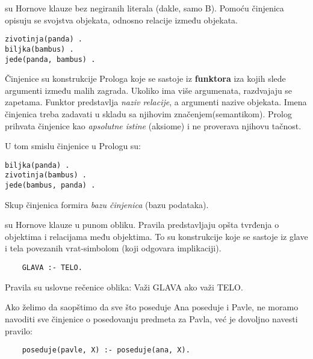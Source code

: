 \documentclass[../main.tex]{subfiles}
\begin{document}
\begin{multicols}{2}
 su Hornove klauze bez negiranih literala (dakle, samo B).  Pomoću činjenica opisuju se svojstva \break objekata, odnosno relacije između objekata.

\begin{boxprimer}
\begin{verbatim}
zivotinja(panda) .
biljka(bambus) .
jede(panda, bambus) .
\end{verbatim}
\end{boxprimer}

\end{multicols}
Činjenice su konstrukcije Prologa koje se sastoje iz {\bf funktora} iza kojih slede argumenti između malih zagrada. 
Ukoliko ima više argumenata, razdvajaju se zapetama. Funktor predstavlja {\it naziv relacije}, a argumenti nazive objekata.
Imena činjenica treba zadavati u skladu sa njihovim značenjem(semantikom). Prolog prihvata činjenice kao {\it apsolutne istine} (aksiome) i ne proverava njihovu tačnost.
\begin{multicols}{2}
\begin{boxprimer}
U tom smislu činjenice u Prologu su:
\begin{verbatim}
biljka(panda) .
zivotinja(bambus) .
jede(bambus, panda) .
\end{verbatim}
\end{boxprimer}
Skup činjenica formira {\it bazu činjenica} (bazu podataka).
\end{multicols}
 su Hornove klauze u punom obliku. Pravila predstavljaju opšta tvrđenja o objektima i relacijama među objektima. To su konstrukcije koje se sastoje iz glave i tela povezanih vrat-simbolom (koji odgovara implikaciji).
\begin{Verbatim}
	GLAVA :- TELO.
\end{Verbatim}

Pravila su uslovne rečenice oblika: Važi GLAVA ako važi TELO.

\begin{boxprimer}
Ako želimo da saopštimo da sve što poseduje Ana poseduje i Pavle, ne moramo navoditi sve činjenice o posedovanju predmeta za Pavla, već je dovoljno navesti pravilo:
\begin{Verbatim}
	poseduje(pavle, X) :- poseduje(ana, X).
\end{Verbatim}
\end{boxprimer}
\end{document}
